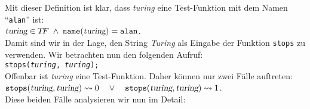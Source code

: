 Mit dieser Definition ist klar, dass \textsl{turing} eine Test-Funktion mit dem Namen
``\texttt{alan}'' ist: \\[0.3cm]
\hspace*{1.3cm} $\textsl{turing} \in T\!F \;\wedge\; \mathtt{name}(\textsl{turing}) = \mathtt{alan}$. \\[0.3cm]
Damit sind wir in der Lage, den String \textsl{Turing} als Eingabe der Funktion \texttt{stops}
zu verwenden.  Wir betrachten nun den folgenden Aufruf: \\[0.3cm]
\hspace*{1.3cm} \texttt{stops(\textsl{turing}, \textsl{turing});} \\[0.3cm]
Offenbar ist \textsl{turing} eine Test-Funktion.  Daher k\"onnen nur zwei F\"alle auftreten:
\\[0.1cm]
\hspace*{1.3cm} 
$\mathtt{stops}(\textsl{turing}, \textsl{turing}) \leadsto 0 \quad \vee\quad
 \mathtt{stops}(\textsl{turing}, \textsl{turing}) \leadsto 1$. \\[0.1cm]
Diese beiden F\"alle analysieren wir nun im Detail:
